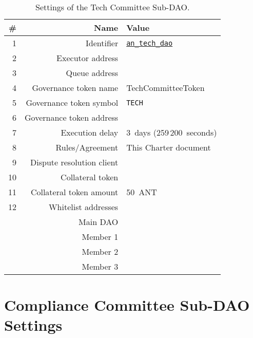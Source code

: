 \begin{table}[h!]
	\caption{Settings of the Tech Committee Sub-DAO.}
	\centering
	\begin{tabular}{rrl}
		\toprule
		\# & Name & Value \\
		\midrule
		 1 & Identifier					& \href{https://govern.aragon.org/\#/daos/an_tech_dao}{\texttt{an\_tech\_dao}}\\
		 2 & Executor address			& \techSubDaoAddr\\
		 3 & Queue address				& \techSubDaoQueueAddr\\
		 4 & Governance token name		& TechCommitteeToken\\
		 5 & Governance token symbol	& \texttt{TECH}\\
		 6 & Governance token address	& \techSubDaoTokenAddr\\
		 7 & Execution delay			& 3~days (259\,200~seconds)\\
		 8 & Rules/Agreement			& This Charter document\\
		 9 & Dispute resolution client	& \aragonCourtAddr\\
		10 & Collateral token			& \antTokenAddr\\
		11 & Collateral token amount	& 50~\ac{ANT}\\
		12 & Whitelist addresses 		& \\
			& Main \ac{DAO} 			& \mainDaoAddr\\
			& Member 1 					& \techSubDaoMemberAddrI\\
			& Member 2 					& \techSubDaoMemberAddrII\\
			& Member 3 					& \techSubDaoMemberAddrIII\\
		\bottomrule
	\end{tabular}
\end{table}


\section{Compliance Committee Sub-DAO Settings}


